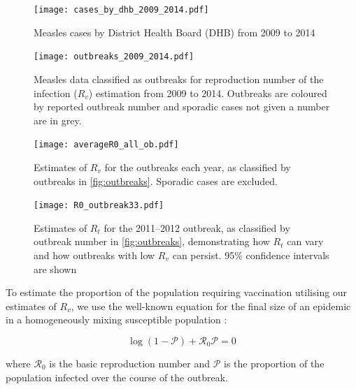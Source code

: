 \documentclass{article}
\newcommand{\Pe}{\mathcal{P}}
\newcommand{\Ro}{\mathcal{R}_0}
\begin{document}
\begin{figure}
\begin{center}
     \texttt{[image: cases\_by\_dhb\_2009\_2014.pdf]}
          \end{center}
\caption{Measles cases by District Health Board (DHB) from 2009 to 2014}
     \label{fig:dhbcases}
\end{figure}

\begin{figure}
\begin{center}
     \texttt{[image: outbreaks\_2009\_2014.pdf]}
     \end{center}
     \caption{Measles data classified as outbreaks for reproduction number of the infection ($R_v$) estimation from 2009 to 2014. Outbreaks are coloured by reported outbreak number and sporadic cases not given a number are in grey.}
     \label{fig:outbreaks}
\end{figure}

\begin{figure}
\begin{center}
     \texttt{[image: averageR0\_all\_ob.pdf]}
     \end{center}
     \caption{Estimates of $R_v$ for the outbreaks each year, as classified by outbreaks in \autoref{fig:outbreaks}. Sporadic cases are excluded.}
     \label{fig:r0}
\end{figure}

\begin{figure}
\begin{center}
     \texttt{[image: R0\_outbreak33.pdf]}
     \end{center}
     \caption{Estimates of $R_t$ for the 2011--2012 outbreak, as classified by outbreak number in \autoref{fig:outbreaks}, demonstrating how  $R_t$ can vary and how outbreaks with low  $R_v$ can persist. 95\% confidence intervals are shown}
     \label{fig:r0_2011}
\end{figure}

To estimate the proportion of the population requiring vaccination utilising our estimates of $R_v$, we use the well-known equation for the final size of an epidemic in a homogeneously mixing susceptible population \citep{diekmann13}:

\begin{equation} \label{eq:eqn1}
\log\left(1-\Pe\right)+\Ro\Pe=0
\end{equation}

where $\Ro$ is the basic reproduction number and $\Pe$ is the proportion of the population infected over the course of the outbreak.
\end{document}
